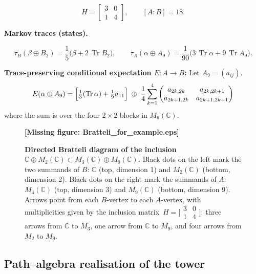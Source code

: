 \documentclass[11pt]{article}
\theoremstyle{mytheoremstyle}
\theoremstyle{definition}
\theoremstyle{remark}
\DeclareMathOperator{\Tr}{Tr}
\newcommand{\bbC}{\mathbb{C}}
\newcommand{\missingfigure}[1]{{\color{MyRed} \bfseries [Missing figure: #1]}}
\begin{document}
\[
  H=\begin{bmatrix}3&0\\
  1&4\end{bmatrix},
  \qquad
  [A:B]=18.
\]

\textbf{Markov traces (states).}

\[
  \tau_B(\beta\oplus B_2)=\frac15\!\bigl(\beta+2\,\Tr B_2\bigr), \qquad
  \tau_A(\alpha\oplus A_9)=\frac1{90}\bigl(3\,\Tr\alpha+9\,\Tr A_9\bigr).
\]

\textbf{Trace-preserving conditional expectation \(E:A\to B\):}
Let $A_9 = (a_{ij})$.
\[
  E(\alpha\oplus A_{9})=
  \Bigl[\tfrac13(\Tr\alpha)+\tfrac19 a_{11}\Bigr]
  \;\oplus\; 
  \frac{1}{4}
  \sum_{k=1}^4 \begin{pmatrix} a_{2k, 2k} & a_{2k, 2k+1} \\ a_{2k+1, 2k} & a_{2k+1, 2k+1} \end{pmatrix}
\]
where the sum is over the four $2 \times 2$ blocks in $M_9(\mathbb{C})$.

\begin{figure}[ht]
  \centering
  \missingfigure{Bratteli_for_example.eps}
  \caption[Directed Bratteli diagram for $\bbC\oplus M_{2}\subset M_{3}\oplus M_{9}$] { \small\textbf{Directed Bratteli diagram of the inclusion
\(\bbC\oplus M_{2}(\mathbb{C})\subset M_{3}(\mathbb{C})\oplus M_{9}(\mathbb{C})\).}
Black dots on the left mark the two summands of \(B\):
\(\bbC\) (top, dimension 1) and \(M_{2}(\mathbb{C})\) (bottom, dimension 2).
Black dots on the right mark the summands of \(A\):
\(M_{3}(\mathbb{C})\) (top, dimension 3) and \(M_{9}(\mathbb{C})\) (bottom, dimension 9).
Arrows point from each \(B\)-vertex to each \(A\)-vertex, with multiplicities
given by the inclusion matrix
\(\,H=\bigl[\!\begin{smallmatrix}3&0\\
1&4\end{smallmatrix}\bigr]\): 
three arrows from \(\bbC\) to \(M_{3}\), one arrow from \(\bbC\) to \(M_{9}\),
and four arrows from \(M_{2}\) to \(M_{9}\).
}
  \label{fig:Bratteli-2x2}
\end{figure}


\newpage
\subsection{Path–algebra realisation of the tower}
\end{document}
